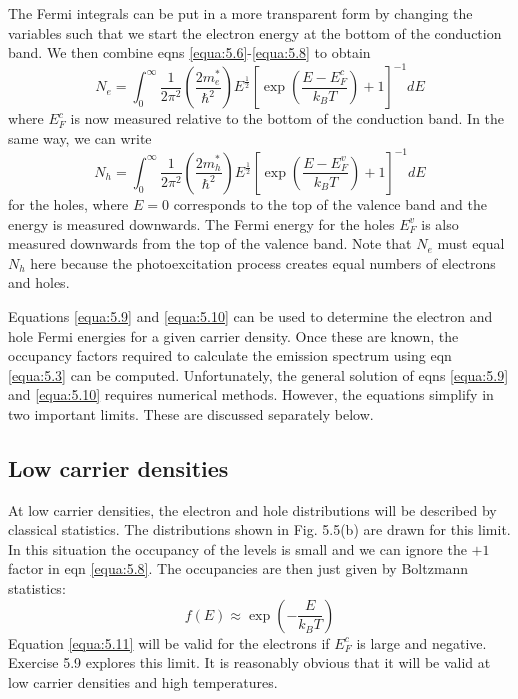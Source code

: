 \documentclass[12pt]{book}
\begin{document}
The Fermi integrals can be put in a more transparent form by changing the variables such that we start the electron energy at the bottom of the conduction band. We then combine eqns \ref{equa:5.6}-\ref{equa:5.8} to obtain
\begin{equation}\label{equa:5.9}
  N_e=\int_0^{\infty}\frac{1}{2\pi^2}(\frac{2m_e^*}{\hbar^2})E^{\frac{1}{2}}[\exp(\frac{E-E_F^c}{k_BT})+1]^{-1}dE
\end{equation}
where $E_F^c$ is now measured relative to the bottom of the conduction band. In the same way, we can write
\begin{equation}\label{equa:5.10}
  N_h=\int_0^{\infty}\frac{1}{2\pi^2}(\frac{2m_h^*}{\hbar^2})E^{\frac{1}{2}}[\exp(\frac{E-E_F^v}{k_BT})+1]^{-1}dE
\end{equation}
for the holes, where $E = 0$ corresponds to the top of the valence band and the energy is measured downwards. The Fermi energy for the holes $E_F^v$ is also measured downwards from the top of the valence band. Note that $N_e$ must equal $N_h$ here because the photoexcitation process creates equal numbers of electrons and holes.

Equations \ref{equa:5.9} and \ref{equa:5.10} can be used to determine the electron and hole Fermi energies for a given carrier density. Once these are known, the occupancy factors required to calculate the emission spectrum using eqn \ref{equa:5.3} can be computed. Unfortunately, the general solution of eqns \ref{equa:5.9} and \ref{equa:5.10} requires numerical methods. However, the equations simplify in two important limits. These are discussed separately below.

\subsection{Low carrier densities}
At low carrier densities, the electron and hole distributions will be described by classical statistics. The distributions shown in Fig. 5.5(b) are drawn for this limit. In this situation the occupancy of the levels is small and we can ignore the $+1$ factor in eqn \ref{equa:5.8}. The occupancies are then just given by Boltzmann statistics:
\begin{equation}\label{equa:5.11}
  f(E)\approx\exp(-\frac{E}{k_BT})
\end{equation}
Equation \ref{equa:5.11} will be valid for the electrons if $E_F^c$ is large and negative. Exercise 5.9 explores this limit. It is reasonably obvious that it will be valid at low carrier densities and high temperatures.
\end{document}
